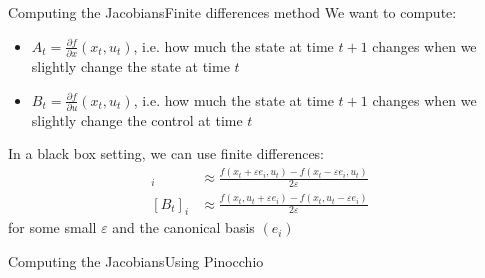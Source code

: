 \documentclass[aspectratio=169]{beamer}
\theoremstyle{definition}
\begin{document}
\begin{frame}{Computing the Jacobians}{Finite differences method}
    We want to compute:
    \begin{itemize}
        \item $A_t=\frac{\partial f}{\partial x}(x_t, u_t)$, i.e. how much the state at time $t+1$ changes when we slightly change the state at time $t$
        \item $B_t=\frac{\partial f}{\partial u}(x_t, u_t)$, i.e. how much the state at time $t+1$ changes when we slightly change the control at time $t$
    \end{itemize}
    In a black box setting, we can use finite differences:
    \begin{align*}
        [A_t]_i &\approx \frac{f(x_t+\varepsilon e_i, u_t)-f(x_t-\varepsilon e_i, u_t)}{2\varepsilon}\\
        [B_t]_i &\approx \frac{f(x_t, u_t+\varepsilon e_i)-f(x_t, u_t-\varepsilon e_i)}{2\varepsilon}
    \end{align*}
    for some small $\varepsilon$ and the canonical basis $(e_i)$
\end{frame}

\begin{frame}{Computing the Jacobians}{Using Pinocchio}
    
\end{frame}
\end{document}
